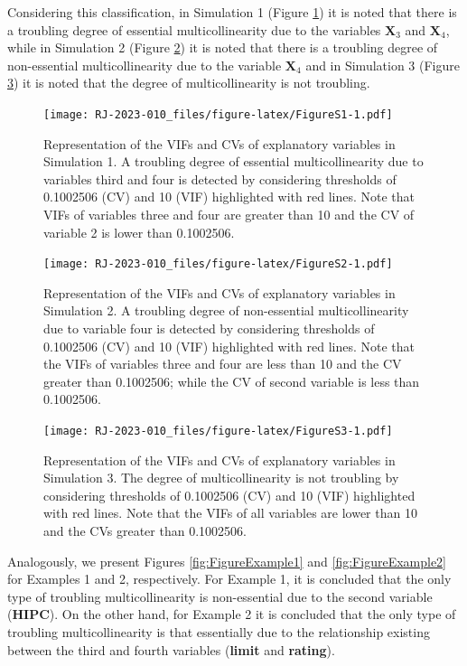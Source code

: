 Considering this classification, in Simulation 1 (Figure \ref{fig:FigureS1}) it is noted that there is a troubling degree of essential multicollinearity due to the variables \(\mathbf{X}_{3}\) and \(\mathbf{X}_{4}\), while in Simulation 2 (Figure \ref{fig:FigureS2}) it is noted that there is a troubling degree of non-essential multicollinearity due to the variable \(\mathbf{X}_{4}\) and in Simulation 3 (Figure \ref{fig:FigureS3}) it is noted that the degree of multicollinearity is not troubling.

\begin{figure}
\centering
\texttt{[image: RJ-2023-010\_files/figure-latex/FigureS1-1.pdf]}
\caption{\label{fig:FigureS1}Representation of the VIFs and CVs of explanatory variables in Simulation 1. A troubling degree of essential multicollinearity due to variables third and four is detected by considering thresholds of 0.1002506 (CV) and 10 (VIF) highlighted with red lines. Note that VIFs of variables three and four are greater than 10 and the CV of variable 2 is lower than 0.1002506.}
\end{figure}

\begin{figure}
\centering
\texttt{[image: RJ-2023-010\_files/figure-latex/FigureS2-1.pdf]}
\caption{\label{fig:FigureS2}Representation of the VIFs and CVs of explanatory variables in Simulation 2. A troubling degree of non-essential multicollinearity due to variable four is detected by considering thresholds of 0.1002506 (CV) and 10 (VIF) highlighted with red lines. Note that the VIFs of variables three and four are less than 10 and the CV greater than 0.1002506; while the CV of second variable is less than 0.1002506.}
\end{figure}

\begin{figure}
\centering
\texttt{[image: RJ-2023-010\_files/figure-latex/FigureS3-1.pdf]}
\caption{\label{fig:FigureS3}Representation of the VIFs and CVs of explanatory variables in Simulation 3. The degree of multicollinearity is not troubling by considering thresholds of 0.1002506 (CV) and 10 (VIF) highlighted with red lines. Note that the VIFs of all variables are lower than 10 and the CVs greater than 0.1002506.}
\end{figure}

Analogously, we present Figures \ref{fig:FigureExample1} and \ref{fig:FigureExample2} for Examples 1 and 2, respectively. For Example 1, it is concluded that the only type of troubling multicollinearity is non-essential due to the second variable (\textbf{HIPC}). On the other hand, for Example 2 it is concluded that the only type of troubling multicollinearity is that essentially due to the relationship existing between the third and fourth variables (\textbf{limit} and \textbf{rating}).

